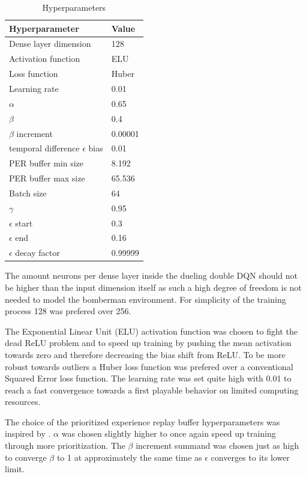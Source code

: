 \begin{table}[hbt!]
	\caption{Hyperparameters}
	\label{tab:hyperparameters}
	\begin{tabular}{|p{}|p{}|}
		\hline
		\textbf{Hyperparameter} & \textbf{Value} \\ \hline
		Dense layer dimension & 128 \\ \hline
		\hline
		Activation function & ELU \\ \hline
		Loss function & Huber \\ \hline
		Learning rate & 0.01 \\ \hline
		\hline
		$\alpha$ & 0.65 \\ \hline
		$\beta$ & 0.4 \\ \hline
		$\beta$ increment & 0.00001 \\ \hline
		temporal difference $\epsilon$ bias & 0.01 \\ \hline
		\hline
		PER buffer min size & 8.192 \\ \hline
		PER buffer max size & 65.536 \\ \hline
		Batch size & 64 \\ \hline
		\hline
		$\gamma$ & 0.95 \\ \hline
		$\epsilon$ start & 0.3 \\ \hline
		$\epsilon$ end & 0.16 \\ \hline
		$\epsilon$ decay factor & 0.99999 \\ \hline
	\end{tabular}
\end{table}

The amount neurons per dense layer inside the dueling double DQN should not be higher than the input dimension itself as such a high degree of freedom is not needed to model the bomberman environment. For simplicity of the training process 128 was prefered over 256. 

The Exponential Linear Unit (ELU) activation function was chosen to fight the dead ReLU problem and to speed up training by pushing the mean activation towards zero and therefore decreasing the bias shift from ReLU. To be more robust towards outliers a Huber loss function was prefered over a conventional Squared Error loss function. The learning rate was set quite high with 0.01 to reach a fast convergence towards a first playable behavior on limited computing resources. 

The choice of the prioritized experience replay buffer hyperparameters was inspired by \cite{Schaul2016}. $\alpha$ was chosen slightly higher to once again speed up training through more prioritization. The $\beta$ increment summand was chosen just as high to converge $\beta$ to 1 at approximately the same time as $\epsilon$ converges to its lower limit. 

